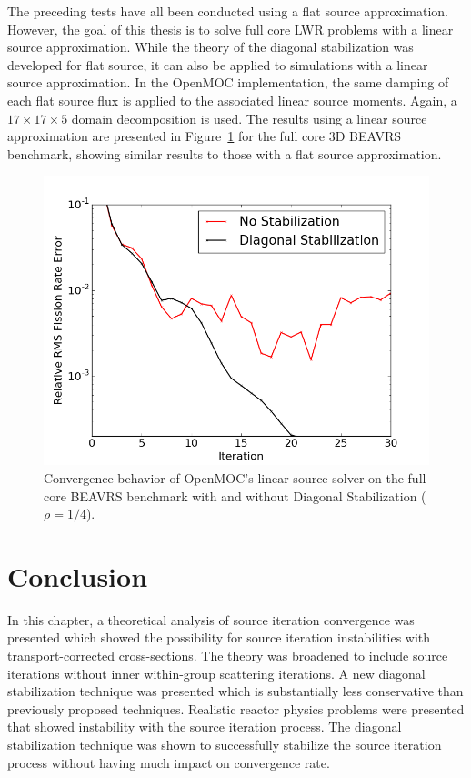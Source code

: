 The preceding tests have all been conducted using a flat source approximation. However, the goal of this thesis is to solve full core \ac{LWR} problems with a linear source approximation. While the theory of the diagonal stabilization was developed for flat source, it can also be applied to simulations with a linear source approximation. In the OpenMOC implementation, the same damping of each flat source flux is applied to the associated linear source moments. Again, a $17 \times 17 \times 5$ domain decomposition is used. The results using a linear source approximation are presented in Figure~\ref{fig:fc-3D-ls} for the full core 3D BEAVRS benchmark, showing similar results to those with a flat source approximation.

\begin{figure}[ht!]
	\centering
	\includegraphics[width=0.65\linewidth]{figures/convergence/full-core-3D-ls.png}
	\caption{Convergence behavior of OpenMOC's linear source solver on the full core \ac{BEAVRS} benchmark with and without Diagonal Stabilization ($\rho = 1/4$).}
	\label{fig:fc-3D-ls}
\end{figure}

\section{Conclusion}
\label{sec:convergence-conclusion}

In this chapter, a theoretical analysis of source iteration convergence was presented which showed the possibility for source iteration instabilities with transport-corrected cross-sections. The theory was broadened to include source iterations without inner within-group scattering iterations. A new diagonal stabilization technique was presented which is substantially less conservative than previously proposed techniques. Realistic reactor physics problems were presented that showed instability with the source iteration process. The diagonal stabilization technique was shown to successfully stabilize the source iteration process without having much impact on convergence rate.

